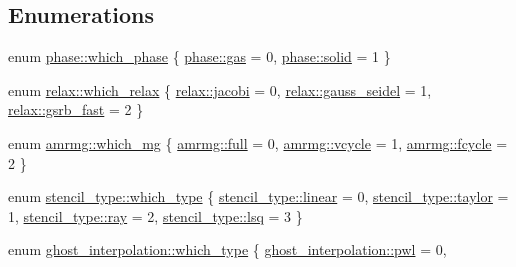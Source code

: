 \subsection*{Enumerations}
\begin{DoxyCompactItemize}
\item 
enum \hyperlink{namespacephase_a23c76f548a5eb1955ed8c929c541108b}{phase\+::which\+\_\+phase} \{ \hyperlink{namespacephase_a23c76f548a5eb1955ed8c929c541108bad0a7c1eb8fd916c8b7ec85be0fd23b38}{phase\+::gas} = 0, 
\hyperlink{namespacephase_a23c76f548a5eb1955ed8c929c541108bac0a46ca6c8cf218e8324eddc9518aeed}{phase\+::solid} = 1
 \}
\item 
enum \hyperlink{namespacerelax_a1b017edf55c06d103aa5b61e015fe219}{relax\+::which\+\_\+relax} \{ \hyperlink{namespacerelax_a1b017edf55c06d103aa5b61e015fe219a1073c20e3821cec05d1066df068d31b9}{relax\+::jacobi} = 0, 
\hyperlink{namespacerelax_a1b017edf55c06d103aa5b61e015fe219a700230972d3f799f1bb7d8275715ee13}{relax\+::gauss\+\_\+seidel} = 1, 
\hyperlink{namespacerelax_a1b017edf55c06d103aa5b61e015fe219a9f7cf3af97cc2038d3aceba1dbd02c7b}{relax\+::gsrb\+\_\+fast} = 2
 \}
\item 
enum \hyperlink{namespaceamrmg_aa3e75c1253c968e52106305f762a7952}{amrmg\+::which\+\_\+mg} \{ \hyperlink{namespaceamrmg_aa3e75c1253c968e52106305f762a7952a39f49d43c37db32f88f26ad6f9090b70}{amrmg\+::full} = 0, 
\hyperlink{namespaceamrmg_aa3e75c1253c968e52106305f762a7952abcef3ebc4ac4f095d5cf0e2e2b35c23e}{amrmg\+::vcycle} = 1, 
\hyperlink{namespaceamrmg_aa3e75c1253c968e52106305f762a7952a158040c252d92b86566d6bd7047896b4}{amrmg\+::fcycle} = 2
 \}
\item 
enum \hyperlink{namespacestencil__type_a1ffed19935b7289b50e8dcc017ee99c8}{stencil\+\_\+type\+::which\+\_\+type} \{ \hyperlink{namespacestencil__type_a1ffed19935b7289b50e8dcc017ee99c8ad26562f23a3212bb1aaf532932f501dd}{stencil\+\_\+type\+::linear} = 0, 
\hyperlink{namespacestencil__type_a1ffed19935b7289b50e8dcc017ee99c8a525dea9e3766ba38f13bb09014fd3555}{stencil\+\_\+type\+::taylor} = 1, 
\hyperlink{namespacestencil__type_a1ffed19935b7289b50e8dcc017ee99c8af7c4595e54e5d99d50f088e03db2360c}{stencil\+\_\+type\+::ray} = 2, 
\hyperlink{namespacestencil__type_a1ffed19935b7289b50e8dcc017ee99c8ad71056491f974feffd7139219ab62d25}{stencil\+\_\+type\+::lsq} = 3
 \}
\item 
enum \hyperlink{namespaceghost__interpolation_a2e226123d3c841dd1034c7e62db3468c}{ghost\+\_\+interpolation\+::which\+\_\+type} \{ \hyperlink{namespaceghost__interpolation_a2e226123d3c841dd1034c7e62db3468ca2b27f77c82388ff9c7dc23de43d414bf}{ghost\+\_\+interpolation\+::pwl} = 0, 

\end{DoxyCompactItemize}
